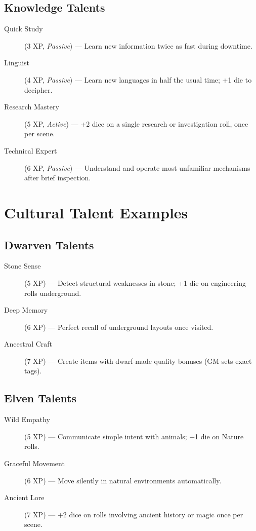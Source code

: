 \subsection*{Knowledge Talents}
\begin{description}
\item[Quick Study] (3 XP, \emph{Passive}) --- Learn new information twice as fast during downtime.
\item[Linguist] (4 XP, \emph{Passive}) --- Learn new languages in half the usual time; +1 die to decipher.
\item[Research Mastery] (5 XP, \emph{Active}) --- +2 dice on a single research or investigation roll, once per scene.
\item[Technical Expert] (6 XP, \emph{Passive}) --- Understand and operate most unfamiliar mechanisms after brief inspection.
\end{description}

\section{Cultural Talent Examples}

\subsection*{Dwarven Talents}
\begin{description}
\item[Stone Sense] (5 XP) --- Detect structural weaknesses in stone; +1 die on engineering rolls underground.
\item[Deep Memory] (6 XP) --- Perfect recall of underground layouts once visited.
\item[Ancestral Craft] (7 XP) --- Create items with dwarf-made quality bonuses (GM sets exact tags).
\end{description}

\subsection*{Elven Talents}
\begin{description}
\item[Wild Empathy] (5 XP) --- Communicate simple intent with animals; +1 die on Nature rolls.
\item[Graceful Movement] (6 XP) --- Move silently in natural environments automatically.
\item[Ancient Lore] (7 XP) --- +2 dice on rolls involving ancient history or magic once per scene.
\end{description}

